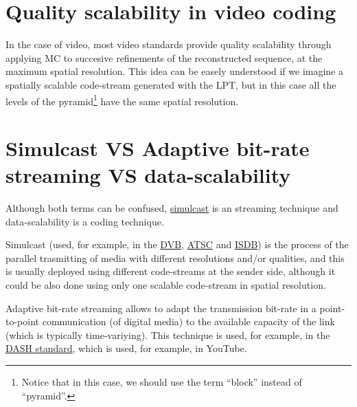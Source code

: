 \section{Quality scalability in video coding~\cite{vruiz__video_scalability}}

In the case of video, most video standards provide quality scalability
through applying MC to succesive refinements of the reconstructed
sequence, at the maximum spatial resolution. This idea can be easely
understood if we imagine a spatially scalable code-stream generated
with the LPT, but in this case all the levels of the
pyramid\footnote{Notice that in this case, we should use the term
  ``block'' instead of ``pyramid''.} have the same spatial
resolution.


\section{Simulcast VS Adaptive bit-rate streaming VS data-scalability}


Although both terms can be confused,
\href{https://en.wikipedia.org/wiki/Simulcast}{simulcast} is an
streaming technique and data-scalability is a coding technique.

Simulcast (used, for example, in the
\href{https://en.wikipedia.org/wiki/DVB}{DVB},
\href{https://en.wikipedia.org/wiki/ATSC_standards}{ATSC} and
\href{https://en.wikipedia.org/wiki/ISDB}{ISDB}) is the process of the
parallel trasmitting of media with different resolutions and/or
qualities, and this is usually deployed using different code-streams
at the sender side, although it could be also done using only one
scalable code-stream in spatial resolution.

Adaptive bit-rate streaming allows to adapt the transmission bit-rate
in a point-to-point communication (of digital media) to the available
capacity of the link (which is typically time-variying). This
technique is used, for example, in the
\href{https://en.wikipedia.org/wiki/Dynamic_Adaptive_Streaming_over_HTTP}{DASH
  standard}, which is used, for example, in YouTube.


